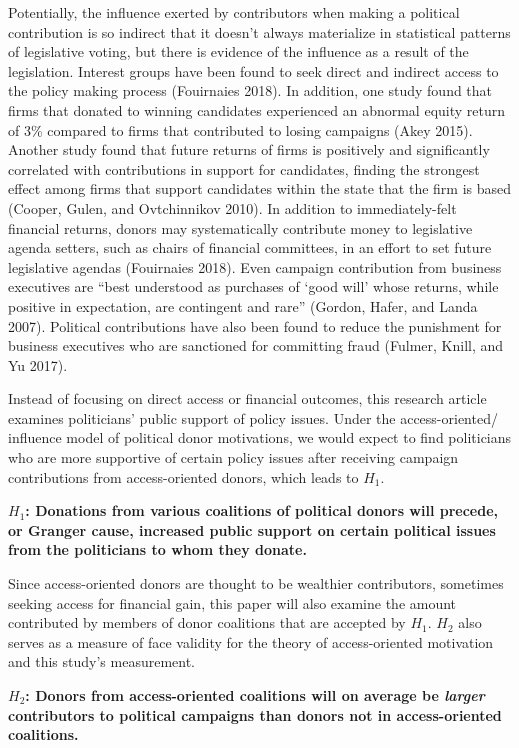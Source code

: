 \documentclass[12pt,]{article}
\begin{document}
Potentially, the influence exerted by contributors when making a
political contribution is so indirect that it doesn't always materialize
in statistical patterns of legislative voting, but there is evidence of
the influence as a result of the legislation. Interest groups have been
found to seek direct and indirect access to the policy making process
(Fouirnaies 2018). In addition, one study found that firms that donated
to winning candidates experienced an abnormal equity return of 3\%
compared to firms that contributed to losing campaigns (Akey 2015).
Another study found that future returns of firms is positively and
significantly correlated with contributions in support for candidates,
finding the strongest effect among firms that support candidates within
the state that the firm is based (Cooper, Gulen, and Ovtchinnikov 2010).
In addition to immediately-felt financial returns, donors may
systematically contribute money to legislative agenda setters, such as
chairs of financial committees, in an effort to set future legislative
agendas (Fouirnaies 2018). Even campaign contribution from business
executives are ``best understood as purchases of `good will' whose
returns, while positive in expectation, are contingent and rare''
(Gordon, Hafer, and Landa 2007). Political contributions have also been
found to reduce the punishment for business executives who are
sanctioned for committing fraud (Fulmer, Knill, and Yu 2017).

Instead of focusing on direct access or financial outcomes, this
research article examines politicians' public support of policy issues.
Under the access-oriented/ influence model of political donor
motivations, we would expect to find politicians who are more supportive
of certain policy issues after receiving campaign contributions from
access-oriented donors, which leads to \(H_{1}\).

\textbf{\(H_{1}\): Donations from various coalitions of political donors
will precede, or Granger cause, increased public support on certain
political issues from the politicians to whom they donate.}

Since access-oriented donors are thought to be wealthier contributors,
sometimes seeking access for financial gain, this paper will also
examine the amount contributed by members of donor coalitions that are
accepted by \(H_{1}\). \(H_{2}\) also serves as a measure of face
validity for the theory of access-oriented motivation and this study's
measurement.

\textbf{\(H_{2}\): Donors from access-oriented coalitions will on
average be \emph{larger} contributors to political campaigns than donors
not in access-oriented coalitions.}
\end{document}
